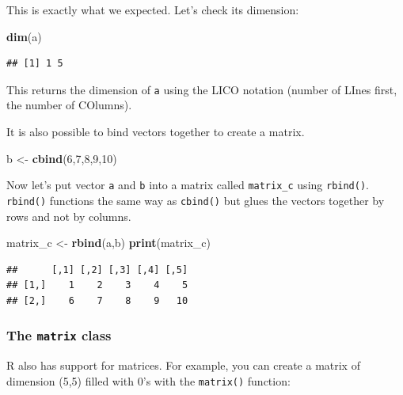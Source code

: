 \documentclass[]{gitbook}
\newenvironment{Shaded}{\begin{snugshade}}{\end{snugshade}}
\newcommand{\DecValTok}[1]{\textcolor[rgb]{0.00,0.00,0.81}{#1}}
\newcommand{\KeywordTok}[1]{\textcolor[rgb]{0.13,0.29,0.53}{\textbf{#1}}}
\newcommand{\NormalTok}[1]{#1}
\newcommand{\StringTok}[1]{\textcolor[rgb]{0.31,0.60,0.02}{#1}}
\theoremstyle{definition}
\theoremstyle{definition}
\theoremstyle{definition}
\theoremstyle{remark}
\begin{document}
This is exactly what we expected. Let's check its dimension:

\begin{Shaded}
\begin{Highlighting}[]
\KeywordTok{dim}\NormalTok{(a)}
\end{Highlighting}
\end{Shaded}

\begin{verbatim}
## [1] 1 5
\end{verbatim}

This returns the dimension of \texttt{a} using the LICO notation (number
of LInes first, the number of COlumns).

It is also possible to bind vectors together to create a matrix.

\begin{Shaded}
\begin{Highlighting}[]
\NormalTok{b <-}\StringTok{ }\KeywordTok{cbind}\NormalTok{(}\DecValTok{6}\NormalTok{,}\DecValTok{7}\NormalTok{,}\DecValTok{8}\NormalTok{,}\DecValTok{9}\NormalTok{,}\DecValTok{10}\NormalTok{)}
\end{Highlighting}
\end{Shaded}

Now let's put vector \texttt{a} and \texttt{b} into a matrix called
\texttt{matrix\_c} using \texttt{rbind()}. \texttt{rbind()} functions
the same way as \texttt{cbind()} but glues the vectors together by rows
and not by columns.

\begin{Shaded}
\begin{Highlighting}[]
\NormalTok{matrix_c <-}\StringTok{ }\KeywordTok{rbind}\NormalTok{(a,b)}
\KeywordTok{print}\NormalTok{(matrix_c)}
\end{Highlighting}
\end{Shaded}

\begin{verbatim}
##      [,1] [,2] [,3] [,4] [,5]
## [1,]    1    2    3    4    5
## [2,]    6    7    8    9   10
\end{verbatim}

\hypertarget{the-matrix-class}{%
\subsubsection{\texorpdfstring{The \texttt{matrix}
class}{The matrix class}}\label{the-matrix-class}}

R also has support for matrices. For example, you can create a matrix of
dimension (5,5) filled with 0's with the \texttt{matrix()} function:
\end{document}
